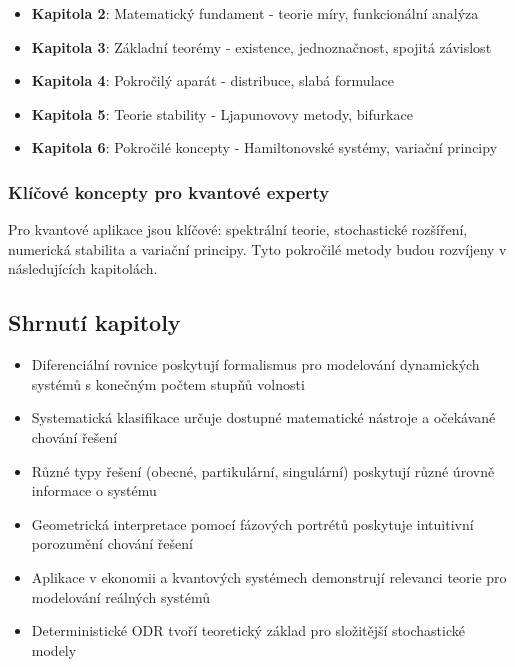 \begin{itemize}
\item \textbf{Kapitola 2}: Matematický fundament - teorie míry, funkcionální analýza
\item \textbf{Kapitola 3}: Základní teorémy - existence, jednoznačnost, spojitá závislost
\item \textbf{Kapitola 4}: Pokročilý aparát - distribuce, slabá formulace
\item \textbf{Kapitola 5}: Teorie stability - Ljapunovovy metody, bifurkace
\item \textbf{Kapitola 6}: Pokročilé koncepty - Hamiltonovské systémy, variační principy
\end{itemize}

\subsubsection{Klíčové koncepty pro kvantové experty}

\begin{keyinsight}
Pro kvantové aplikace jsou klíčové: spektrální teorie, stochastické rozšíření, numerická stabilita a variační principy. Tyto pokročilé metody budou rozvíjeny v následujících kapitolách.
\end{keyinsight}

\spc

\subsection*{Shrnutí kapitoly}

\begin{itemize}
\item Diferenciální rovnice poskytují formalismus pro modelování dynamických systémů s konečným počtem stupňů volnosti

\item Systematická klasifikace určuje dostupné matematické nástroje a očekávané chování řešení

\item Různé typy řešení (obecné, partikulární, singulární) poskytují různé úrovně informace o systému

\item Geometrická interpretace pomocí fázových portrétů poskytuje intuitivní porozumění chování řešení

\item Aplikace v ekonomii a kvantových systémech demonstrují relevanci teorie pro modelování reálných systémů

\item Deterministické ODR tvoří teoretický základ pro složitější stochastické modely
\end{itemize}


